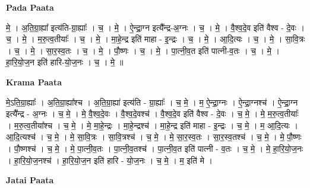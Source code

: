 \documentclass[17pt]{extarticle}
\begin{document}
\textbf{Pada Paata} \newline

मे॒ । अ॒ति॒ग्रा॒ह्या᳚ इत्य॑ति-ग्रा॒ह्याः᳚ । च॒ । मे॒ । ऐ॒न्द्रा॒ग्न इत्यै᳚न्द्र-अ॒ग्नः । च॒ । मे॒ । वै॒श्व॒दे॒व इति॑ वैश्व - दे॒वः । च॒ । मे॒ । म॒रु॒त्व॒तीयाः᳚ । च॒ । मे॒ । मा॒हे॒न्द्र इति॑ माहा - इ॒न्द्रः । च॒ । मे॒ । आ॒दि॒त्यः । च॒ । मे॒ । सा॒वि॒त्रः । च॒ । मे॒ । सा॒र॒स्व॒तः । च॒ । मे॒ । पौ॒ष्णः । च॒ । मे॒ । पा॒त्नी॒व॒त इति॑ पात्नी-व॒तः । च॒ । मे॒ । हा॒रि॒यो॒ज॒न इति॑ हारि-यो॒ज॒नः । च॒ । मे॒ ॥  \newline


\textbf{Krama Paata} \newline

मे॒ऽति॒ग्रा॒ह्याः᳚ । अ॒ति॒ग्रा॒ह्या᳚श्च । अ॒ति॒ग्रा॒ह्या॑ इत्य॑ति - ग्रा॒ह्याः᳚ । च॒ मे॒ । म॒ ऐ॒न्द्रा॒ग्नः । ऐ॒न्द्रा॒ग्नश्च॑ । ऐ॒न्द्रा॒ग्न इत्यै᳚न्द्र - अ॒ग्नः । च॒ मे॒ । मे॒ वै॒श्व॒दे॒वः । वै॒श्व॒दे॒वश्च॑ । वै॒श्व॒दे॒व इति॑ वैश्व - दे॒वः । च॒ मे॒ । मे॒ म॒रु॒त्व॒तीयाः᳚ । म॒रु॒त्व॒तीया᳚श्च । च॒ मे॒ । मे॒ मा॒हे॒न्द्रः । मा॒हे॒न्द्रश्च॑ । मा॒हे॒न्द्र इति॑ माहा - इ॒न्द्रः । च॒ मे॒ । म॒ आ॒दि॒त्यः । आ॒दि॒त्यश्च॑ । च॒ मे॒ । मे॒ सा॒वि॒त्रः । सा॒वि॒त्रश्च॑ । च॒ मे॒ । मे॒ सा॒र॒स्व॒तः । सा॒र॒स्व॒तश्च॑ । च॒ मे॒ । मे॒ पौ॒ष्णः । पौ॒ष्णश्च॑ । च॒ मे॒ । मे॒ पा॒त्नी॒व॒तः । पा॒त्नी॒व॒तश्च॑ । पा॒त्नी॒व॒त इति॑ पात्नी - व॒तः । 
च॒ मे॒ । मे॒ हा॒रि॒यो॒ज॒नः । हा॒रि॒यो॒ज॒नश्च॑ । हा॒रि॒यो॒ज॒न इति॑ हारि - यो॒ज॒नः । च॒ मे॒ । म॒ इति॑ मे । \newline

\textbf{Jatai Paata} \newline
\end{document}
